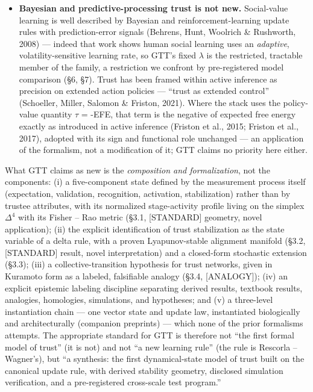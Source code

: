 \documentclass[11pt,twocolumn]{article}
\theoremstyle{gttdef}
\theoremstyle{gttplain}
\begin{document}
\begin{itemize}
\item \textbf{Bayesian and predictive-processing trust is not new.} Social-value learning is well described by Bayesian and reinforcement-learning update rules with prediction-error signals (Behrens, Hunt, Woolrich \& Rushworth, 2008) --- indeed that work shows human social learning uses an \emph{adaptive}, volatility-sensitive learning rate, so GTT's fixed $\lambda$ is the restricted, tractable member of the family, a restriction we confront by pre-registered model comparison (\S{}6, \S{}7). Trust has been framed within active inference as precision on extended action policies --- ``trust as extended control'' (Schoeller, Miller, Salomon \& Friston, 2021). Where the stack uses the policy-value quantity $\tau$ = -EFE, that term is the negative of expected free energy exactly as introduced in active inference (Friston et al., 2015; Friston et al., 2017), adopted with its sign and functional role unchanged --- an application of the formalism, not a modification of it; GTT claims no priority here either.

\end{itemize}

What GTT claims as new is the \emph{composition and formalization}, not the components: (i) a five-component state defined by the measurement process itself (expectation, validation, recognition, activation, stabilization) rather than by trustee attributes, with its normalized stage-activity profile living on the simplex $\Delta^{4}$ with its Fisher -- Rao metric (\S{}3.1, [STANDARD] geometry, novel application); (ii) the explicit identification of trust stabilization as the state variable of a delta rule, with a proven Lyapunov-stable alignment manifold (\S{}3.2, [STANDARD] result, novel interpretation) and a closed-form stochastic extension (\S{}3.3); (iii) a collective-transition hypothesis for trust networks, given in Kuramoto form as a labeled, falsifiable analogy (\S{}3.4, [ANALOGY]); (iv) an explicit epistemic labeling discipline separating derived results, textbook results, analogies, homologies, simulations, and hypotheses; and (v) a three-level instantiation chain --- one vector state and update law, instantiated biologically and architecturally (companion preprints) --- which none of the prior formalisms attempts. The appropriate standard for GTT is therefore not ``the first formal model of trust'' (it is not) and not ``a new learning rule'' (the rule is Rescorla -- Wagner's), but ``a synthesis: the first dynamical-state model of trust built on the canonical update rule, with derived stability geometry, disclosed simulation verification, and a pre-registered cross-scale test program.''
\end{document}
